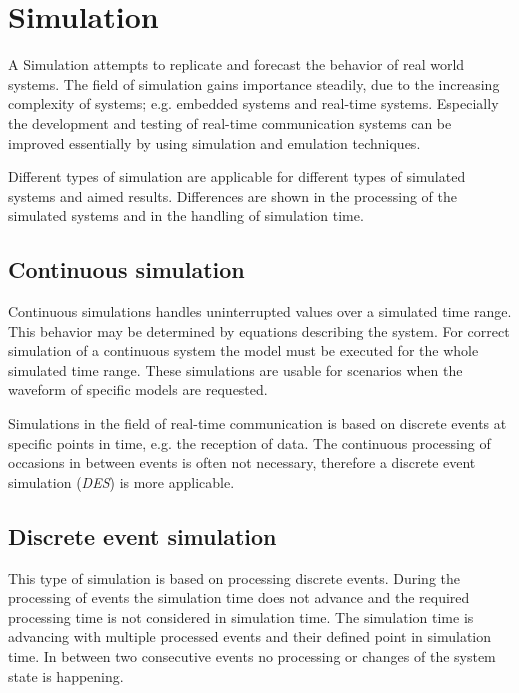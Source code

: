 \chapter{Simulation}
\label{cha:simulation}

A Simulation attempts to replicate and forecast the behavior of real world systems.
The field of simulation gains importance steadily, due to the increasing complexity of systems; e.g. embedded systems and real-time systems.
Especially the development and testing of real-time communication systems can be improved essentially by using simulation and emulation techniques.

Different types of simulation are applicable for different types of simulated systems and aimed results.
Differences are shown in the processing of the simulated systems and in the handling of simulation time.
\cite[section 1.2]{mchaney2009understanding}

\section{Continuous simulation}
\label{sec:simulation_cont}
Continuous simulations handles uninterrupted values over a simulated time range.
This behavior may be determined by equations describing the system.
For correct simulation of a continuous system the model must be executed for the whole simulated time range.
These simulations are usable for scenarios when the waveform of specific models are requested. \cite[section 1.2.1]{mchaney2009understanding}

Simulations in the field of real-time communication is based on discrete events at specific points in time, e.g. the reception of data.
The continuous processing of occasions in between events is often not necessary, therefore a discrete event simulation (\emph{DES}) is more applicable.

\section{Discrete event simulation}
\label{sec:simulation_event}
This type of simulation is based on processing discrete events.
During the processing of events the simulation time does not advance and the required processing time is not considered in simulation time.
The simulation time is advancing with multiple processed events and their defined point in simulation time.
In between two consecutive events no processing or changes of the system state is happening. \cite[chapter 1]{matloff_introduction_2008}

